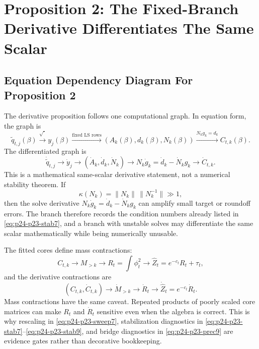 \documentclass[11pt]{article}
\numberwithin{equation}{section}
\begin{document}
\section{Proposition 2: The Fixed-Branch Derivative Differentiates The Same Scalar}

\subsection*{Equation Dependency Diagram For Proposition 2}

The derivative proposition follows one computational graph.  In equation form,
the graph is
\begin{equation}
    \widetilde q_{t,j}(\beta)
    \xrightarrow{\sqrt{\cdot}}
    y_j(\beta)
    \xrightarrow{\text{fixed LS rows}}
    (A_k(\beta),d_k(\beta),N_k(\beta))
    \xrightarrow{N_kg_k=d_k}
    C_{t,k}(\beta).
    \label{eq:p24-p23-gdag1}
\end{equation}
The differentiated graph is
\begin{equation}
    \dot{\widetilde q}_{t,j}
    \to
    \dot y_j
    \to
    (\dot A_k,\dot d_k,\dot N_k)
    \to
    N_k\dot g_k=\dot d_k-\dot N_k g_k
    \to
    \dot C_{t,k}.
    \label{eq:p24-p23-gdag2}
\end{equation}
This is a mathematical same-scalar derivative statement, not a numerical
stability theorem.  If
\begin{equation}
    \kappa(N_k)
    =
    \|N_k\|\,\|N_k^{-1}\|
    \gg 1,
    \label{eq:p24-p23-gdag2a}
\end{equation}
then the solve derivative
\(N_k\dot g_k=\dot d_k-\dot N_kg_k\) can amplify small target or roundoff
errors.  The branch therefore records the condition numbers already listed in
\eqref{eq:p24-p23-stab7}, and a branch with unstable solves may differentiate the same
scalar mathematically while being numerically unusable.

The fitted cores define mass contractions:
\begin{equation}
    C_{t,k}
    \to
    M_{>k}
    \to
    R_t=\int\phi_t^2
    \to
    \widehat Z_t=e^{-c_t}R_t+\tau_t,
    \label{eq:p24-p23-gdag3}
\end{equation}
and the derivative contractions are
\begin{equation}
    (C_{t,k},\dot C_{t,k})
    \to
    \dot M_{>k}
    \to
    \dot R_t
    \to
    \dot{\widehat Z}_t=e^{-c_t}\dot R_t.
    \label{eq:p24-p23-gdag4}
\end{equation}
Mass contractions have the same caveat.  Repeated products of poorly scaled
core matrices can make \(R_t\) and \(\dot R_t\) sensitive even when the algebra
is correct.  This is why rescaling in \eqref{eq:p24-p23-sweep7}, stabilization diagnostics
in \eqref{eq:p24-p23-stab7}--\eqref{eq:p24-p23-stab9}, and bridge diagnostics in \eqref{eq:p24-p23-prec9} are
evidence gates rather than decorative bookkeeping.
\end{document}
